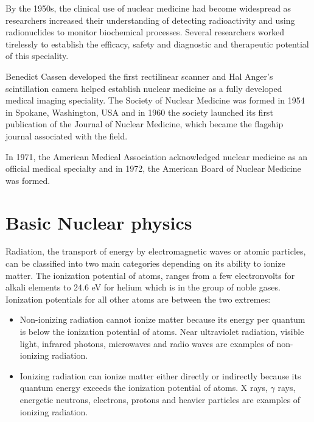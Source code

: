 \documentclass{article}
\begin{document}
By the 1950s, the clinical use of nuclear medicine had become widespread as researchers increased their understanding of detecting radioactivity and using radionuclides to monitor biochemical processes. Several researchers worked tirelessly to establish the efficacy, safety and diagnostic and therapeutic potential of this speciality.

Benedict Cassen developed the first rectilinear scanner and Hal Anger’s scintillation camera helped establish nuclear medicine as a fully developed medical imaging speciality. The Society of Nuclear Medicine was formed in 1954 in Spokane, Washington, USA and in 1960 the society launched its first publication of the Journal of Nuclear Medicine, which became the flagship journal associated with the field.

In 1971, the American Medical Association acknowledged nuclear medicine as an official medical specialty and in 1972, the American Board of Nuclear Medicine was formed.

\section*{Basic Nuclear physics}
Radiation, the transport of energy by electromagnetic waves or atomic particles, can be classified into two main categories depending on its ability to ionize matter. The ionization potential of atoms, ranges from a few electronvolts for alkali elements to 24.6 eV for helium which is in the group of noble gases. Ionization potentials for all other atoms are between the two extremes:
\begin{itemize}
    \item Non-ionizing radiation cannot ionize matter because its energy per quantum is below the ionization potential of atoms. Near ultraviolet radiation, visible light, infrared photons, microwaves and radio waves are examples of non-ionizing radiation.
    \item Ionizing radiation can ionize matter either directly or indirectly because its quantum energy exceeds the ionization potential of atoms. X rays, $\gamma$ rays, energetic neutrons, electrons, protons and heavier particles are examples of ionizing radiation.
\end{itemize}
\end{document}
